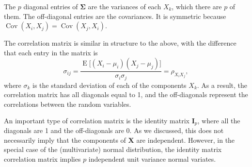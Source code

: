 \documentclass[
]{book}
\newcommand{\bI}{{\boldsymbol I}}
\newcommand{\bX}{{\boldsymbol X}}
\newcommand{\bSigma}{{\boldsymbol\Sigma}}
\DeclareMathOperator{\E}{E}
\DeclareMathOperator{\Cov}{Cov}
\theoremstyle{definition}
\theoremstyle{definition}
\theoremstyle{definition}
\theoremstyle{definition}
\theoremstyle{remark}
\begin{document}
The \(p\) diagonal entries of \(\bSigma\) are the variances of each \(X_k\), which there are \(p\) of them.
The off-diagonal entries are the covariances.
It is symmetric because \(\Cov(X_i,X_j)=\Cov(X_j,X_i)\).

The correlation matrix is similar in structure to the above, with the difference that each entry in the matrix is
\[
\sigma_{ij} = \frac{\E\big[(X_i-\mu_i)(X_j-\mu_j) \big]}{\sigma_i\sigma_j} = \rho_{X_iX_j},
\]
where \(\sigma_k\) is the standard deviation of each of the components \(X_k\).
As a result, the correlation matrix has all diagonals equal to 1, and the off-diagonals represent the correlations between the random variables.

An important type of correlation matrix is the identity matrix \(\bI_p\), where all the diagonals are 1 and the off-diagonals are 0.
As we discussed, this does not necessarily imply that the components of \(\bX\) are independent.
However, in the special case of the (multivariate) normal distribution, the identity matrix correlation matrix implies \(p\) independent unit variance normal variates.
\end{document}
